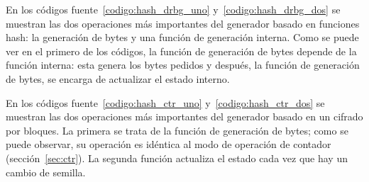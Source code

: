 En los códigos fuente~\ref{codigo:hash_drbg_uno} y~\ref{codigo:hash_drbg_dos}
se muestran las dos operaciones más importantes del generador basado en
funciones hash: la generación de bytes y una función de generación interna.
Como se puede ver en el primero de los códigos, la función de generación de
bytes depende de la función interna: esta genera los bytes pedidos y después,
la función de generación de bytes, se encarga de actualizar el estado interno.



En los códigos fuente~\ref{codigo:hash_ctr_uno} y~\ref{codigo:hash_ctr_dos}
se muestran las dos operaciones más importantes del generador basado en un
cifrado por bloques. La primera se trata de la función de generación de bytes;
como se puede observar, su operación es idéntica al modo de operación de
contador (sección~\ref{sec:ctr}). La segunda función actualiza el estado
cada vez que hay un cambio de semilla.
